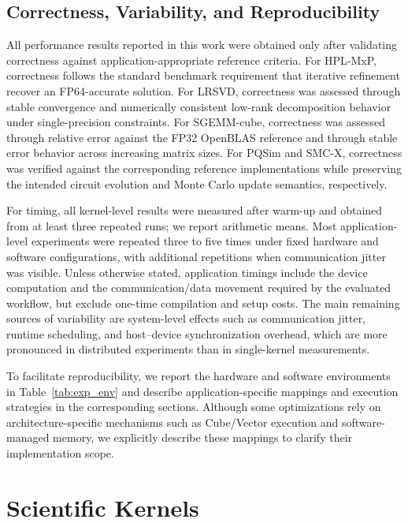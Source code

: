 \documentclass{article}
\newcommand{\rev}[1]{#1}
\begin{document}
\subsection{Correctness, Variability, and Reproducibility}

All performance results reported in this work were obtained only after validating correctness against application-appropriate reference criteria. For HPL-MxP, correctness follows the standard benchmark requirement that iterative refinement recover an FP64-accurate solution. For LRSVD, correctness was assessed through stable convergence and numerically consistent low-rank decomposition behavior under single-precision constraints. For SGEMM-cube, correctness was assessed through relative error against the FP32 OpenBLAS reference and through stable error behavior across increasing matrix sizes. For PQSim and SMC-X, correctness was verified against the corresponding reference implementations while preserving the intended circuit evolution and Monte Carlo update semantics, respectively.

\rev{For timing, all kernel-level results were measured after warm-up and obtained from at least three repeated runs; we report arithmetic means. Most application-level experiments were repeated three to five times under fixed hardware and software configurations, with additional repetitions when communication jitter was visible. Unless otherwise stated, application timings include the device computation and the communication/data movement required by the evaluated workflow, but exclude one-time compilation and setup costs. The main remaining sources of variability are system-level effects such as communication jitter, runtime scheduling, and host--device synchronization overhead, which are more pronounced in distributed experiments than in single-kernel measurements.}


\rev{To facilitate reproducibility, we report the hardware and software
environments in Table~\ref{tab:exp_env} and describe application-specific mappings and execution strategies in the corresponding sections. Although some optimizations rely on architecture-specific mechanisms such as Cube/Vector execution and software-managed memory, we explicitly describe these mappings to clarify their implementation scope.}


\section{Scientific Kernels}
\label{sec:core_kernels}
\end{document}
